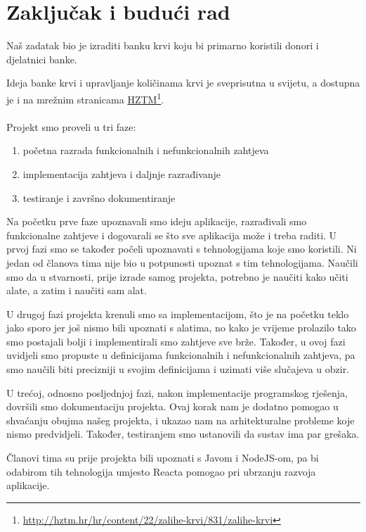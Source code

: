 \chapter{Zaključak i budući rad}
		
		Naš zadatak bio je izraditi banku krvi koju bi primarno koristili donori i djelatnici banke.
	
	Ideja banke krvi i upravljanje količinama krvi je sveprisutna u svijetu, a dostupna je i na mrežnim stranicama \underline{HZTM}\footnote{\url{http://hztm.hr/hr/content/22/zalihe-krvi/831/zalihe-krvi}}.
\\\\
	Projekt smo proveli u tri faze:
	\begin{enumerate}
		\item početna razrada funkcionalnih i nefunkcionalnih zahtjeva
		\item implementacija zahtjeva i daljnje razrađivanje
		\item testiranje i završno dokumentiranje
	\end{enumerate} 

	Na početku prve faze upoznavali smo ideju aplikacije, razrađivali smo funkcionalne zahtjeve i dogovarali se što sve aplikacija može i treba raditi. U prvoj fazi smo se također počeli upoznavati s tehnologijama koje smo koristili. Ni jedan od članova tima nije bio u potpunosti upoznat s tim tehnologijama. Naučili smo da u stvarnosti, prije izrade samog projekta, potrebno je naučiti kako učiti alate, a zatim i naučiti sam alat.
	
	U drugoj fazi projekta krenuli smo sa implementacijom, što je na početku teklo jako sporo jer još nismo bili upoznati s alatima, no kako je vrijeme prolazilo tako smo postajali bolji i implementirali smo zahtjeve sve brže. Također, u ovoj fazi uvidjeli smo propuste u definicijama funkcionalnih i nefunkcionalnih zahtjeva, pa smo naučili biti precizniji u svojim definicijama i uzimati više slučajeva u obzir. 
	
	U trećoj, odnosno posljednjoj fazi, nakon implementacije programskog rješenja, dovršili smo dokumentaciju projekta. Ovaj korak nam je dodatno pomogao u shvaćanju obujma našeg projekta, i ukazao nam na arhitekturalne probleme koje nismo predvidjeli. Također, testiranjem smo ustanovili da sustav ima par grešaka.
	
	Članovi tima su prije projekta bili upoznati s Javom i NodeJS-om, pa bi odabirom tih tehnologija umjesto Reacta pomogao pri ubrzanju razvoja aplikacije. 
	
